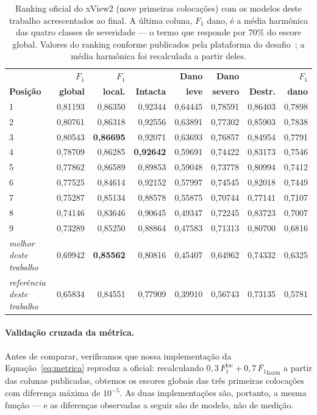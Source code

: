 \documentclass[11pt,a4paper]{article}
\begin{document}
\begin{table}[htbp]
\centering
\caption{Ranking oficial do xView2 (nove primeiras colocações) com os modelos
deste trabalho acrescentados ao final. A última coluna, $F_1$ dano, é a média
harmônica das quatro classes de severidade --- o termo que responde por 70\% do
escore global. Valores do ranking conforme publicados pela plataforma do
desafio~\cite{xview2}; a média harmônica foi recalculada a partir deles.}
\label{tab:leaderboard}
\small
\begin{tabular}{lrrrrrrr}
\toprule
& \textbf{$F_1$} & \textbf{$F_1$} & & \textbf{Dano} & \textbf{Dano} &
& \textbf{$F_1$} \\
\textbf{Posição} & \textbf{global} & \textbf{local.} & \textbf{Intacta} &
\textbf{leve} & \textbf{severo} & \textbf{Destr.} & \textbf{dano} \\
\midrule
1 & 0{,}81193 & 0{,}86350 & 0{,}92344 & 0{,}64445 & 0{,}78591 & 0{,}86403 & 0{,}7898 \\
2 & 0{,}80761 & 0{,}86318 & 0{,}92556 & 0{,}63891 & 0{,}77302 & 0{,}85903 & 0{,}7838 \\
3 & 0{,}80543 & \textbf{0{,}86695} & 0{,}92071 & 0{,}63693 & 0{,}76857 & 0{,}84954 & 0{,}7791 \\
4 & 0{,}78709 & 0{,}86285 & \textbf{0{,}92642} & 0{,}59691 & 0{,}74422 & 0{,}83173 & 0{,}7546 \\
5 & 0{,}77862 & 0{,}86589 & 0{,}89853 & 0{,}59048 & 0{,}73778 & 0{,}80994 & 0{,}7412 \\
6 & 0{,}77525 & 0{,}84614 & 0{,}92152 & 0{,}57997 & 0{,}74545 & 0{,}82018 & 0{,}7449 \\
7 & 0{,}75287 & 0{,}85134 & 0{,}88578 & 0{,}55875 & 0{,}70744 & 0{,}77141 & 0{,}7107 \\
8 & 0{,}74146 & 0{,}83646 & 0{,}90645 & 0{,}49347 & 0{,}72245 & 0{,}83723 & 0{,}7007 \\
9 & 0{,}73289 & 0{,}85250 & 0{,}88864 & 0{,}47583 & 0{,}71313 & 0{,}80700 & 0{,}6816 \\
\midrule
\emph{melhor deste trabalho} & 0{,}69942 & \textbf{0{,}85562} & 0{,}80816 &
  0{,}45407 & 0{,}64962 & 0{,}74332 & 0{,}6325 \\
\emph{referência deste trabalho} & 0{,}65834 & 0{,}84551 & 0{,}77909 &
  0{,}39910 & 0{,}56743 & 0{,}73135 & 0{,}5781 \\
\bottomrule
\end{tabular}
\end{table}

\paragraph{Validação cruzada da métrica.} Antes de comparar, verificamos que
nossa implementação da Equação~\ref{eq:metrica} reproduz a oficial: recalculando
$0{,}3\,F_1^{\text{loc}} + 0{,}7\,\overline{F_1}_{\text{harm}}$ a partir das
colunas publicadas, obtemos os escores globais das três primeiras colocações com
diferença máxima de $10^{-5}$. As duas implementações são, portanto, a mesma
função --- e as diferenças observadas a seguir são de modelo, não de medição.
\end{document}
